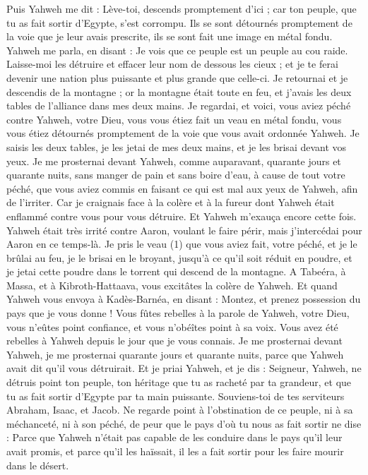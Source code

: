 \begin{multicols}{2}
Puis Yahweh me dit : Lève-toi, descends promptement d'ici ; car ton peuple, que tu as fait sortir d'Egypte, s'est corrompu. Ils se sont détournés promptement de la voie que je leur avais prescrite, ils se sont fait une image en métal fondu.
Yahweh me parla, en disant : Je vois que ce peuple est un peuple au cou raide.
Laisse-moi les détruire et effacer leur nom de dessous les cieux ; et je te ferai devenir une nation plus puissante et plus grande que celle-ci.
Je retournai et je descendis de la montagne ; or la montagne était toute en feu, et j’avais les deux tables de l'alliance dans mes deux mains.
Je regardai, et voici, vous aviez péché contre Yahweh, votre Dieu, vous vous étiez fait un veau en métal fondu, vous vous étiez détournés promptement de la voie que vous avait ordonnée Yahweh.
Je saisis les deux tables, je les jetai de mes deux mains, et je les brisai devant vos yeux.
Je me prosternai devant Yahweh, comme auparavant, quarante jours et quarante nuits, sans manger de pain et sans boire d'eau, à cause de tout votre péché, que vous aviez commis en faisant ce qui est mal aux yeux de Yahweh, afin de l'irriter.
Car je craignais face à la colère et à la fureur dont Yahweh était enflammé contre vous pour vous détruire. Et Yahweh m'exauça encore cette fois.
Yahweh était très irrité contre Aaron, voulant le faire périr, mais j’intercédai pour Aaron en ce temps-là.
Je pris le veau (1) que vous aviez fait, votre péché, et je le brûlai au feu, je le brisai en le broyant, jusqu'à ce qu'il soit réduit en poudre, et je jetai cette poudre dans le torrent qui descend de la montagne.
A Tabeéra, à Massa, et à Kibroth-Hattaava, vous excitâtes la colère de Yahweh.
Et quand Yahweh vous envoya à Kadès-Barnéa, en disant : Montez, et prenez possession du pays que je vous donne ! Vous fûtes rebelles à la parole de Yahweh, votre Dieu, vous n’eûtes point confiance, et vous n'obéîtes point à sa voix.
Vous avez été rebelles à Yahweh depuis le jour que je vous connais.
Je me prosternai devant Yahweh, je me prosternai quarante jours et quarante nuits, parce que Yahweh avait dit qu'il vous détruirait.
Et je priai Yahweh, et je dis : Seigneur, Yahweh, ne détruis point ton peuple, ton héritage que tu as racheté par ta grandeur, et que tu as fait sortir d'Egypte par ta main puissante.
Souviens-toi de tes serviteurs Abraham, Isaac, et Jacob. Ne regarde point à l’obstination de ce peuple, ni à sa méchanceté, ni à son péché,
de peur que le pays d’où tu nous as fait sortir ne dise : Parce que Yahweh n’était pas capable de les conduire dans le pays qu’il leur avait promis, et parce qu’il les haïssait, il les a fait sortir pour les faire mourir dans le désert.

\end{multicols}
